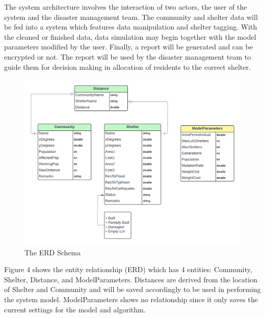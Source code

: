 	The system architecture involves the interaction of two actors, the user of the system and the disaster management team. The community and shelter data will be fed into a system which features data manipulation and shelter tagging. With the cleaned or finished data, data simulation may begin together with the model parameters modified by the user. Finally, a report will be generated and can be encrypted or not. The report will be used by the disaster management team to guide them for decision making in allocation of residents to the correct shelter.

	\begin{figure}[h!]
		\caption{The ERD Schema}
		\centering
		\includegraphics[width=\textwidth]{ERD}
	\end{figure}
	
	Figure 4 shows the entity relationship (ERD) which has 4 entities: Community, Shelter, Distance, and ModelParameters. Distances are derived from the location of Shelter and Community and will be saved accordingly to be used in performing the system model. ModelParameters shows no relationship since it only saves the current settings for the model and algorithm.
	
